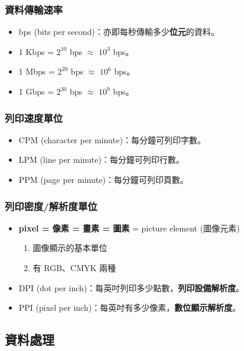 \documentclass[12pt,a4paper,oneside]{book}
\begin{document}
\begin{CJK}{UTF8}{bkai}
\subsubsection{資料傳輸速率}
\begin{itemize}
\item bps (bits per second)：亦即每秒傳輸多少\textbf{位元}的資料。
\item 1 Kbps = $2^{10}$ bps $\approx$ $10^{3}$ bps。
\item 1 Mbps = $2^{20}$ bps $\approx$ $10^{6}$ bps。
\item 1 Gbps = $2^{30}$ bps $\approx$ $10^{9}$ bps。
\end{itemize}

\subsubsection{列印速度單位}
\begin{itemize}
\item CPM (character per minute)：每分鐘可列印字數。
\item LPM (line per minute)：每分鐘可列印行數。
\item PPM (page per minute)：每分鐘可列印頁數。
\end{itemize}

\subsubsection{列印密度/解析度單位}
\begin{itemize}
\item \textbf{pixel = 像素 = 畫素 = 圖素} = picture element (圖像元素)
  \begin{enumerate}
  \item 圖像顯示的基本單位
  \item 有 RGB、CMYK 兩種
  \end{enumerate}
\item DPI (dot per inch)：每英吋列印多少點數，\textbf{列印設備解析度}。
\item PPI (pixel per inch)：每英吋有多少像素，\textbf{數位顯示解析度}。
\end{itemize}

\subsection{資料處理}


\end{CJK}
\end{document}
